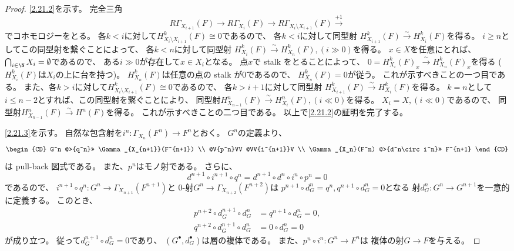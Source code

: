 \documentclass[uplatex,dvipdfmx]{jsarticle}
\begin{document}
\begin{proof}
  \ref{2.21.2}を示す。
  完全三角
  \[
  R\Gamma_{X_{i+1}}(F) \to R\Gamma_{X_i}(F) \to
  R\Gamma_{X_i\setminus X_{i+1}}(F) \xrightarrow{+1}
  \]
  でコホモロジーをとる。
  各\(k < i\)に対して\(H^k_{X_i\setminus X_{i+1}}(F)\cong 0\)であるので、
  各\(k < i\)に対して同型射
  \(H^k_{X_{i+1}}(F) \xrightarrow{\sim} H^k_{X_i}(F)\)を得る。
  \(i\geq n\)としてこの同型射を繋ぐことによって、
  各\(k < n\)に対して同型射
  \(H^k_{X_i}(F) \xrightarrow{\sim} H^k_{X_n}(F), (i \gg 0)\)を得る。
  \(x\in X\)を任意にとれば、
  \(\bigcap_{i\in \N}X_i = \emptyset\)であるので、
  ある\(i\gg 0\)が存在して\(x\in X_i\)となる。
  点\(x\)で stalk をとることによって、
  \(0 = H^k_{X_i}(F)_x \xrightarrow{\sim} H^k_{X_n}(F)_x\)を得る
  (\(H^k_{X_i}(F)\)は\(X_i\)の上に台を持つ)。
  \(H^k_{X_n}(F)\)は任意の点の stalk が\(0\)であるので、
  \(H^k_{X_n}(F) = 0\)が従う。
  これが示すべきことの一つ目である。
  また、各\(k > i\)に対して\(H^k_{X_i\setminus X_{i+1}}(F)\cong 0\)であるので、
  各\(k > i+1\)に対して同型射
  \(H^k_{X_{i+1}}(F) \xrightarrow{\sim} H^k_{X_i}(F)\)を得る。
  \(k=n\)として\(i\leq n-2\)とすれば、この同型射を繋ぐことにより、
  同型射\(H^n_{X_{n-1}}(F) \xrightarrow{\sim} H^n_{X_i}(F), (i\ll 0)\)を得る。
  \(X_i = X, (i\ll 0)\)であるので、
  同型射\(H^n_{X_{n-1}}(F) \xrightarrow{\sim} H^n(F)\)を得る。
  これが示すべきことの二つ目である。
  以上で\ref{2.21.2}の証明を完了する。

  \ref{2.21.3}を示す。
  自然な包含射を\(i^n:\Gamma_{X_n}(F^n) \to F^n\)とおく。
  \(G^n\)の定義より、
  \[
  \begin{CD}
    G^n @>{q^n}>> \Gamma_{X_{n+1}}(F^{n+1}) \\
    @V{p^n}VV @VV{i^{n+1}}V \\
    \Gamma_{X_n}(F^n) @>{d^n\circ i^n}>> F^{n+1}
  \end{CD}
  \]
  は pull-back 図式である。
  また、\(p^n\)はモノ射である。
  さらに、
  \[
  d^{n+1}\circ i^{n+1}\circ q^n
  = d^{n+1}\circ d^n \circ i^n \circ p^n
  = 0
  \]
  であるので、
  \(i^{n+1}\circ q^n:G^n \to \Gamma_{X_{n+1}}(F^{n+1})\)と
  \(0\)-射\(G^n\to \Gamma_{X_{n+2}}(F^{n+2})\)は
  \(p^{n+1}\circ d_G^n = q^n, q^{n+1}\circ d_G^n=0\)となる
  射\(d_G^n:G^n\to G^{n+1}\)を一意的に定義する。
  このとき、
  \begin{align*}
    p^{n+2}\circ d_G^{n+1}\circ d_G^n
    &= q^{n+1}\circ d_G^n = 0, \\
    q^{n+2}\circ d_G^{n+1}\circ d_G^n
    &= 0\circ d_G^n = 0
  \end{align*}
  が成り立つ。
  従って\(d_G^{n+1}\circ d_G^n = 0\)であり、
  \((G^{\bullet},d_G^{\bullet})\)は層の複体である。
  また、\(p^n\circ i^n : G^n\to F^n\)は
  複体の射\(G\to F\)を与える。


\end{proof}
\end{document}
